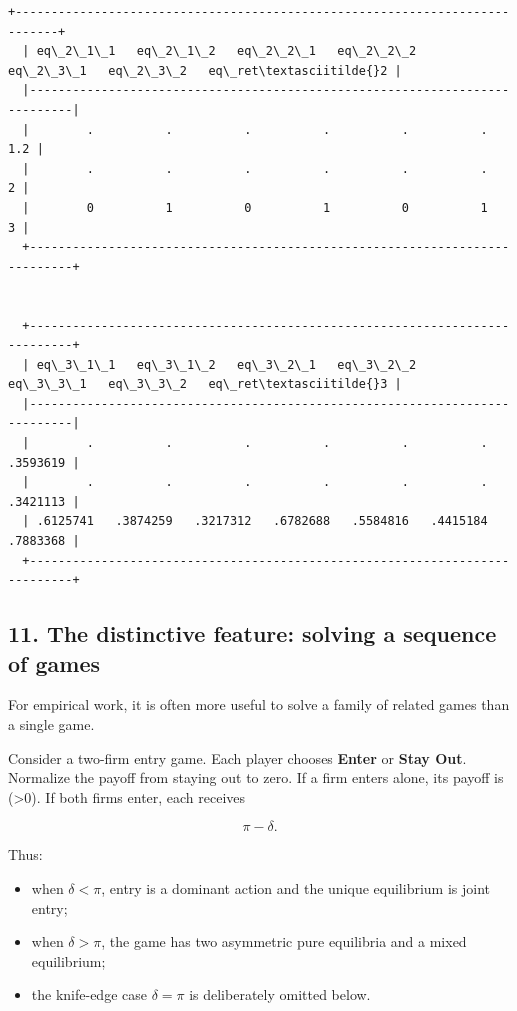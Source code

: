 \documentclass[11pt]{article}
\providecommand{\tightlist}{%
      \setlength{\itemsep}{0pt}\setlength{\parskip}{0pt}}
\begin{document}
\begin{Verbatim}[commandchars=\\\{\}]
  +----------------------------------------------------------------------------+
  | eq\_2\_1\_1   eq\_2\_1\_2   eq\_2\_2\_1   eq\_2\_2\_2   eq\_2\_3\_1   eq\_2\_3\_2   eq\_ret\textasciitilde{}2 |
  |----------------------------------------------------------------------------|
  |        .          .          .          .          .          .        1.2 |
  |        .          .          .          .          .          .          2 |
  |        0          1          0          1          0          1          3 |
  +----------------------------------------------------------------------------+


  +----------------------------------------------------------------------------+
  | eq\_3\_1\_1   eq\_3\_1\_2   eq\_3\_2\_1   eq\_3\_2\_2   eq\_3\_3\_1   eq\_3\_3\_2   eq\_ret\textasciitilde{}3 |
  |----------------------------------------------------------------------------|
  |        .          .          .          .          .          .   .3593619 |
  |        .          .          .          .          .          .   .3421113 |
  | .6125741   .3874259   .3217312   .6782688   .5584816   .4415184   .7883368 |
  +----------------------------------------------------------------------------+
    \end{Verbatim}

    \hypertarget{the-distinctive-feature-solving-a-sequence-of-games}{%
\subsection{11. The distinctive feature: solving a sequence of
games}\label{the-distinctive-feature-solving-a-sequence-of-games}}

For empirical work, it is often more useful to solve a family of related
games than a single game.

Consider a two-firm entry game. Each player chooses \textbf{Enter} or
\textbf{Stay Out}. Normalize the payoff from staying out to zero. If a
firm enters alone, its payoff is (\pi\textgreater0). If both firms
enter, each receives

\[
\pi-\delta.
\]

Thus:

\begin{itemize}
\tightlist
\item
  when \(\delta<\pi\), entry is a dominant action and the unique
  equilibrium is joint entry;
\item
  when \(\delta>\pi\), the game has two asymmetric pure equilibria and a
  mixed equilibrium;
\item
  the knife-edge case \(\delta=\pi\) is deliberately omitted below.
\end{itemize}
\end{document}
